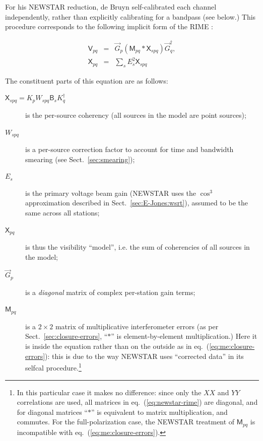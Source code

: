 \documentclass[]{aa}
\newcommand{\jones}[2]{\vec {#1}_{#2}}
\newcommand{\jonesT}[2]{\vec {#1}^\dagger_{#2}}
\newcommand{\coh}[2]{\mathsf{{#1}}_{{#2}}}
\begin{document}
For his NEWSTAR reduction, de Bruyn self-calibrated each channel independently, rather than explicitly calibrating for a bandpass (see below.) This procedure corresponds to the following implicit form of the RIME :

\begin{eqnarray}\label{eq:newstar-rime}
\coh{V}{pq} & = & \jones{G}{p} \left ( \coh{M}{pq} \ast \coh{X}{spq} \right ) \jonesT{G}{q}, \\
\nonumber \coh{X}{pq} & = & \sum_{s} E^2_s \coh{X}{spq} 
\end{eqnarray}

The constituent parts of this equation are as follows:
\begin{description}
\item[$\coh{X}{spq}=K_p W_{spq} \coh{B}{s} K^\dagger_q$] is the per-source coherency (all sources in the model are point sources);
\item[$W_{spq}$] is a per-source correction factor to account for time and bandwidth smearing (see Sect.~\ref{sec:smearing});

\item[$E_s$] is the primary voltage beam gain (NEWSTAR uses the $\cos^3$ approximation described in Sect.~\ref{sec:E-Jones:wsrt}), assumed to be the same across all stations;

\item[$\coh{X}{pq}$] is thus the visibility ``model'', i.e. the sum of coherencies of all sources in the model;

\item[$\jones{G}{p}$] is a {\em diagonal} matrix of complex per-station gain terms;

\item[$\coh{M}{pq}$] is a $2\times2$ matrix of multiplicative interferometer errors (as per Sect.~\ref{sec:closure-errors}, ``$\ast$'' is element-by-element multiplication.) Here it is inside the equation rather than on the outside as in eq.~(\ref{eq:me:closure-errors}): this is due to the way NEWSTAR uses ``corrected data'' in its selfcal procedure.\footnote{In this particular case it makes no difference: since only the $XX$ and $YY$ correlations are used, all matrices in eq.~(\ref{eq:newstar-rime}) are diagonal, and for diagonal matrices ``$\ast$'' is equivalent to matrix multiplication, and commutes. For the full-polarization case, the NEWSTAR treatment of $\coh{M}{pq}$ is incompatible with eq.~(\ref{eq:me:closure-errors}).}

\end{description}
\end{document}
